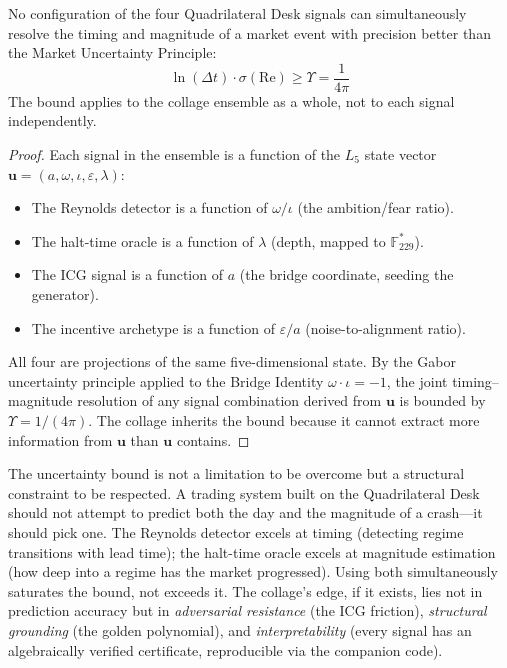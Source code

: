 \begin{theorem}\label{thm:collage_uncertainty}
No configuration of the four Quadrilateral Desk signals can simultaneously resolve the timing and magnitude of a market event with precision better than the Market Uncertainty Principle:
$$\ln(\Delta t) \cdot \sigma(\mathrm{Re}) \geq \Upsilon = \frac{1}{4\pi}$$
The bound applies to the collage ensemble as a whole, not to each signal independently.
\end{theorem}

\begin{proof}
Each signal in the ensemble is a function of the $L_5$ state vector $\mathbf{u} = (a, \omega, \iota, \varepsilon, \lambda)$:
\begin{itemize}[noitemsep]
\item The Reynolds detector is a function of $\omega/\iota$ (the ambition/fear ratio).
\item The halt-time oracle is a function of $\lambda$ (depth, mapped to $\mathbb{F}_{229}^*$).
\item The ICG signal is a function of $a$ (the bridge coordinate, seeding the generator).
\item The incentive archetype is a function of $\varepsilon/a$ (noise-to-alignment ratio).
\end{itemize}
All four are projections of the same five-dimensional state. By the Gabor uncertainty principle applied to the Bridge Identity $\omega \cdot \iota = -1$, the joint timing--magnitude resolution of any signal combination derived from $\mathbf{u}$ is bounded by $\Upsilon = 1/(4\pi)$. The collage inherits the bound because it cannot extract more information from $\mathbf{u}$ than $\mathbf{u}$ contains. \qedhere
\end{proof}

\begin{remark}
The uncertainty bound is not a limitation to be overcome but a structural constraint to be respected. A trading system built on the Quadrilateral Desk should not attempt to predict both the day and the magnitude of a crash---it should pick one. The Reynolds detector excels at timing (detecting regime transitions with lead time); the halt-time oracle excels at magnitude estimation (how deep into a regime has the market progressed). Using both simultaneously saturates the bound, not exceeds it. The collage's edge, if it exists, lies not in prediction accuracy but in \emph{adversarial resistance} (the ICG friction), \emph{structural grounding} (the golden polynomial), and \emph{interpretability} (every signal has an algebraically verified certificate, reproducible via the companion code).
\end{remark}


